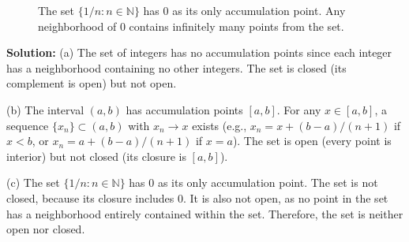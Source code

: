 \begin{figure}[h]
\centering
{}
\caption{The set $\{1/n : n \in \mathbb{N}\}$ has 0 as its only accumulation point. Any neighborhood of 0 contains infinitely many points from the set.}
\end{figure}

\bigskip\noindent\textbf{Solution:} 
(a) The set of integers has no accumulation points since each integer has a neighborhood containing no other integers. The set is closed (its complement is open) but not open.

(b) The interval $(a,b)$ has accumulation points $[a,b]$. For any $x \in [a,b]$, a sequence $\{x_n\} \subset (a,b)$ with $x_n \to x$ exists (e.g., $x_n = x + (b-a)/(n+1)$ if $x < b$, or $x_n = a + (b-a)/(n+1)$ if $x = a$). The set is open (every point is interior) but not closed (its closure is $[a,b]$).

(c) The set $\{1/n : n \in \mathbb{N}\}$ has 0 as its only accumulation point. The set is not closed, because its closure includes 0. It is also not open, as no point in the set has a neighborhood entirely contained within the set. Therefore, the set is neither open nor closed.


